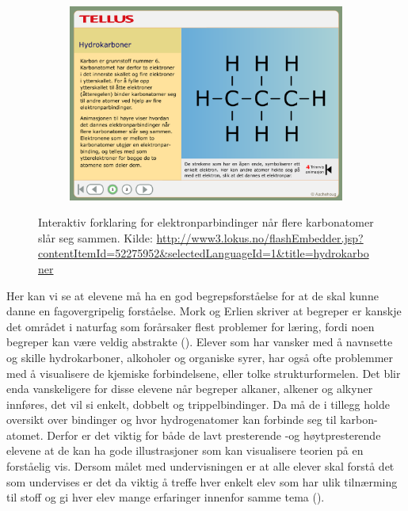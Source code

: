 \documentclass[main.tex]{subfiles}
\begin{document}
\begin{figure}[h!]
\begin{subfigure}{.5\textwidth}
    \end{subfigure}%
    \begin{subfigure}{.5\textwidth}
    \centering
    \includegraphics[scale = 0.199]{../figures/lokus4.png}
    \end{subfigure}
    \caption{Interaktiv forklaring for elektronparbindinger når flere karbonatomer slår seg sammen. Kilde: 
    \protect\url{http://www3.lokus.no/flashEmbedder.jsp?contentItemId=52275952&selectedLanguageId=1&title=hydrokarboner}}
    \label{fig:lokus}
\end{figure}

\hspace{-6mm}Her kan vi se at elevene må ha en god begrepsforståelse for at de skal kunne danne en fagovergripelig forståelse. Mork og Erlien skriver at begreper er kanskje det området i naturfag som forårsaker flest problemer for læring, fordi noen begreper kan være veldig abstrakte (). Elever som har vansker med å navnsette og skille hydrokarboner, alkoholer og organiske syrer, har også ofte problemmer med å visualisere de kjemiske forbindelsene, eller tolke strukturformelen. Det blir enda vanskeligere for disse elevene når begreper alkaner, alkener og alkyner innføres, det vil si enkelt, dobbelt og trippelbindinger. Da må de i tillegg holde oversikt over bindinger og hvor hydrogenatomer kan forbinde seg til karbon-atomet. Derfor er det viktig for både de lavt presterende -og høytpresterende elevene at de kan ha gode illustrasjoner som kan visualisere teorien på en forståelig vis. Dersom målet med undervisningen er at alle elever skal forstå det som undervises er det da viktig å treffe hver enkelt elev som har ulik tilnærming til stoff og gi hver elev mange erfaringer innenfor samme tema (). \newline
\end{document}
